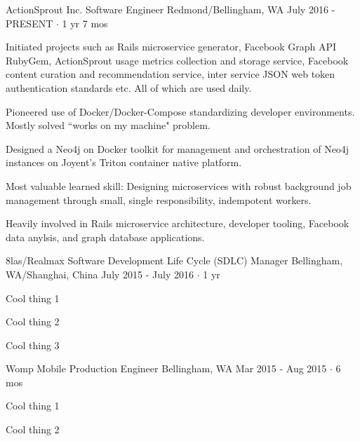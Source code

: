 \documentclass[11pt, a4paper]{awesome-cv}
\begin{document}
\begin{cventries}
  \cventry
    {ActionSprout Inc.} %
    {Software Engineer} %
    {Redmond/Bellingham, WA} %
    {July 2016 - PRESENT $\cdot$ 1 yr 7 mos} %
    {
      \begin{cvitems} %
        \item Initiated projects such as Rails microservice generator, Facebook Graph API RubyGem, ActionSprout usage metrics collection and storage service, Facebook content curation and recommendation service, inter service JSON web token authentication standards etc. All of which are used daily.
        \item Pioneered use of Docker/Docker-Compose standardizing developer environments. Mostly solved ``works on my machine" problem.
        \item Designed a Neo4j on Docker toolkit for management and orchestration of Neo4j instances on Joyent's Triton container native platform.
        \item Most valuable learned skill: Designing microservices with robust background job management through small, single responsibility, indempotent workers.
      \end{cvitems}
    }
    {
      Heavily involved in Rails microservice architecture, developer tooling, Facebook data anylsis, and graph database applications.
    }

  \cventry
    {8las/Realmax} %
    {Software Development Life Cycle (SDLC) Manager} %
    {Bellingham, WA/Shanghai, China} %
    {July 2015 - July 2016 $\cdot$ 1 yr} %
    {
      \begin{cvitems} %
        \item Cool thing 1
        \item Cool thing 2
        \item Cool thing 3
      \end{cvitems}
    }
    {}

  \cventry
    {Womp Mobile} %
    {Production Engineer} %
    {Bellingham, WA} %
    {Mar 2015 - Aug 2015  $\cdot$ 6 mos} %
    {
      \begin{cvitems} %
        \item Cool thing 1
        \item Cool thing 2
      \end{cvitems}
    }
    {}


\end{cventries}
\end{document}
